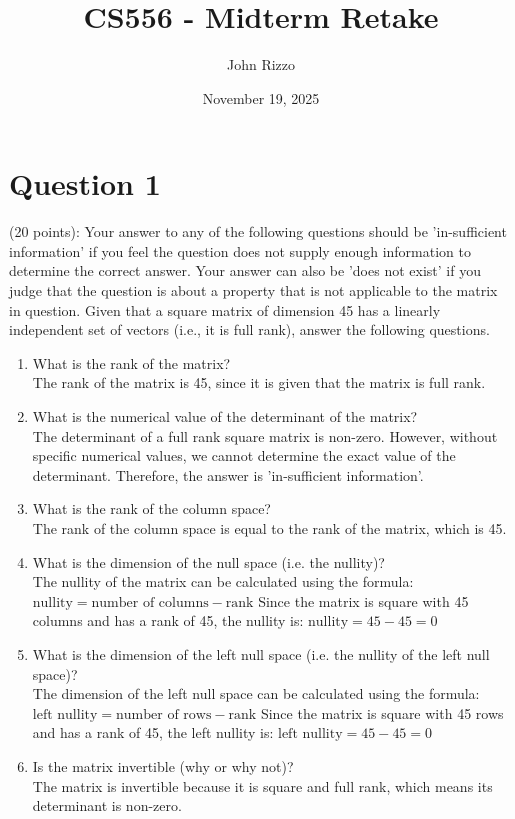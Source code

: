 \documentclass{article}
\title{CS556 - Midterm Retake}
\author{John Rizzo}
\date{November 19, 2025}
\begin{document}
\maketitle

%
\section*{Question 1} (20 points): Your answer to any of the following questions should be 'in-sufficient information' if you feel the question does not supply enough information to determine the correct answer.  Your answer can also be 'does not exist' if you judge that the question is about a property that is not applicable to the matrix in question.  Given that a square matrix of dimension 45 has a linearly independent set of vectors (i.e., it is full rank), answer the following questions.
\begin{enumerate}
    \item What is the rank of the matrix? \\
          The rank of the matrix is 45, since it is given that the matrix is full rank.
    \item What is the numerical value of the determinant of the matrix? \\
          The determinant of a full rank square matrix is non-zero. However, without specific numerical values, we cannot determine the exact value of the determinant. Therefore, the answer is 'in-sufficient information'.
    \item What is the rank of the column space? \\
          The rank of the column space is equal to the rank of the matrix, which is 45.
    \item What is the dimension of the null space (i.e. the nullity)? \\
            The nullity of the matrix can be calculated using the formula: 
            $ \text{nullity} = \text{number of columns} - \text{rank}$
            Since the matrix is square with 45 columns and has a rank of 45, the nullity is:
            $ \text{nullity} = 45 - 45 = 0$
    \item What is the dimension of the left null space (i.e. the nullity of the left null space)? \\
            The dimension of the left null space can be calculated using the formula:
            $\text{left nullity} = \text{number of rows} - \text{rank}$
            Since the matrix is square with 45 rows and has a rank of 45, the left nullity is:
            $\text{left nullity} = 45 - 45 = 0$
    \item Is the matrix invertible (why or why not)? \\
            The matrix is invertible because it is square and full rank, which means its determinant is non-zero.
\end{enumerate}
\end{document}
